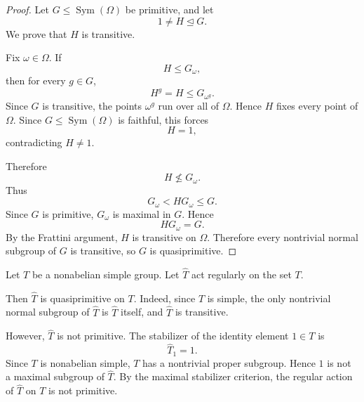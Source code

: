 \begin{proof}
Let \(G\leq \operatorname{Sym}(\Omega)\) be primitive, and let
\[
    1\neq H\unlhd G.
\]
We prove that \(H\) is transitive.

Fix \(\omega\in\Omega\). If
\[
    H\leq G_\omega,
\]
then for every \(g\in G\),
\[
    H^g=H\leq G_{\omega^g}.
\]
Since \(G\) is transitive, the points \(\omega^g\) run over all of \(\Omega\). Hence
\(H\) fixes every point of \(\Omega\). Since \(G\leq \operatorname{Sym}(\Omega)\)
is faithful, this forces
\[
    H=1,
\]
contradicting \(H\neq 1\).

Therefore
\[
    H\nleq G_\omega.
\]
Thus
\[
    G_\omega<HG_\omega\leq G.
\]
Since \(G\) is primitive, \(G_\omega\) is maximal in \(G\). Hence
\[
    HG_\omega=G.
\]
By the Frattini argument, \(H\) is transitive on \(\Omega\). Therefore every
nontrivial normal subgroup of \(G\) is transitive, so \(G\) is quasiprimitive.
\end{proof}

\begin{example}
Let \(T\) be a nonabelian simple group. Let \(\widehat T\) act regularly on the set
\(T\).

Then \(\widehat T\) is quasiprimitive on \(T\). Indeed, since \(T\) is simple, the
only nontrivial normal subgroup of \(\widehat T\) is \(\widehat T\) itself, and
\(\widehat T\) is transitive.

However, \(\widehat T\) is not primitive. The stabilizer of the identity element
\(1\in T\) is
\[
    \widehat T_1=1.
\]
Since \(T\) is nonabelian simple, \(T\) has a nontrivial proper subgroup. Hence
\(1\) is not a maximal subgroup of \(\widehat T\). By the maximal stabilizer
criterion, the regular action of \(\widehat T\) on \(T\) is not primitive.
\end{example}